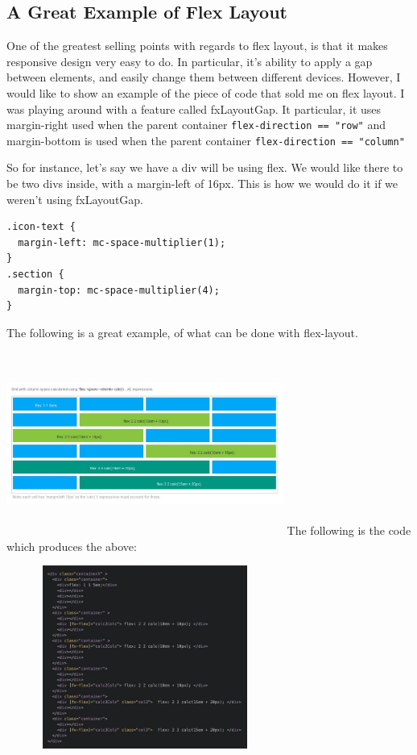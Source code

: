 \subsection{ A Great Example of Flex Layout }

One of the greatest selling points with regards to flex layout, is that it makes
responsive design very easy to do. In particular, it's ability to apply a gap
between elements, and easily change them between different devices. However, I
would like to show an example of the piece of code that sold me on flex layout.
I was playing around with a feature called fxLayoutGap. It particular, it uses
margin-right used when the parent container \lstinline{flex-direction == "row"}
and margin-bottom is used when the parent container \lstinline{flex-direction == "column"}

So for instance, let's say we have a div will be using flex. We would like
there to be two divs inside, with a margin-left of 16px. This is how we would
do it if we weren't using fxLayoutGap.
\begin{lstlisting}
.icon-text {
  margin-left: mc-space-multiplier(1);
}
.section {
  margin-top: mc-space-multiplier(4);
}
\end{lstlisting}


The following is a great example, of what can be done with flex-layout.


\includegraphics[width=9.1cm, height=6cm]{pwa/responsive/flex-layout/flex-layout-grid}
The following is the code which produces the above:


\includegraphics[width=9.1cm, height=6cm]{pwa/responsive/flex-layout/flex-layout-code}
